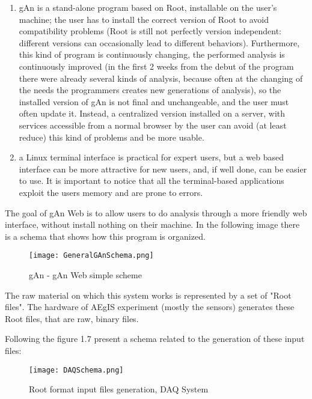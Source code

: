 \begin{enumerate}

\item gAn is a stand-alone program based on Root, installable on the user's machine; the user has to install the correct version of Root to avoid compatibility problems (Root is still not perfectly version independent: different versions can occasionally lead to different behaviors). Furthermore, this kind of program is continuously changing, the performed analysis is continuously improved (in the first 2 weeks from the debut of the program there were already several kinds of analysis, because often at the changing of the needs the programmers creates new generations of analysis), so the installed version of gAn is not final and unchangeable, and the user must often update it. Instead, a centralized version installed on a server, with services accessible from a normal browser by the user can avoid (at least reduce) this kind of problems and be more usable.    
 

\item a Linux terminal interface is practical for expert users, but a web based interface can be more attractive for new users, and, if well done, can be easier to use. It is important to notice that all the terminal-based applications exploit the users memory and are prone to errors.


\end{enumerate}


The goal of gAn Web is to allow users to do analysis through a more friendly web interface, without install nothing on their machine. In the following image there is a schema that shows how this program is organized.

\begin{figure}[H]
\centering
\texttt{[image: GeneralGAnSchema.png]} 
\caption{gAn - gAn Web simple scheme}
\end{figure}





The raw material on which this system works is represented by a set of "Root files". 
The hardware of AEgIS experiment (mostly the sensors) generates these Root files, that are raw, binary files. 
 
Following the figure 1.7 present a schema related to the generation of these input files:

\begin{figure}[H]
\centering
\texttt{[image: DAQSchema.png]} 
\caption{Root format input files generation, DAQ System}
\end{figure}

